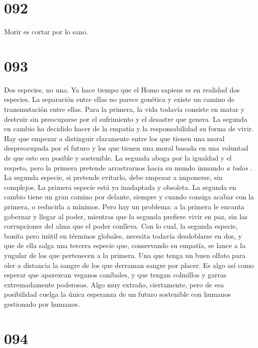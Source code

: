\documentclass[a4paper,11pt,openright,twocolumn]{book}
\begin{document}
\section*{092}

Morir es cortar por lo sano.

\section*{093}

Dos especies, no una. Ya hace tiempo que el Homo sapiens es en realidad dos especies. La separación
entre ellas no parece genética y existe un camino de transmutación entre ellas. Para la primera,
la vida todavía consiste en matar y destruir sin preocuparse
por el sufrimiento y el desastre que genera. La segunda en cambio ha decidido hacer de la empatía y la 
responsabilidad su forma de vivir. Hay que empezar a distinguir claramente entre los que tienen una moral
despreocupada por el futuro y los que tienen una moral basada en una voluntad de que este sea posible
y sostenible. La segunda aboga por la igualdad y el respeto, pero la primera pretende arrastrarnos hacia
su mundo inmundo {\it  a todos}  . La segunda especie, si pretende evitarlo, debe empezar a imponerse, 
sin complejos. La primera especie está
ya inadaptada y obsoleta. La segunda en cambio tiene un gran camino por delante, siempre y cuando consiga
acabar con la primera, o reducirla a mínimos. Pero hay un problema: a la primera le encanta gobernar y
llegar al poder, mientras que la segunda prefiere vivir en paz, sin las corrupciones del alma que el poder
conlleva. Con lo cual, la segunda especie, bonita pero inútil en términos globales, necesita todavía desdoblarse
en dos, y que de ella salga una
tercera especie que, conservando su empatía, se lance a la yugular de los que pertenecen a la primera. Una que
tenga un buen olfato para oler a distancia la sangre de los que derraman sangre por placer. Es
algo así como esperar que aparezcan veganos caníbales, y que tengan colmillos y garras extremadamente poderosas. 
Algo muy extraño, ciertamente, pero de esa posibilidad cuelga
la única esperanza de un futuro sostenible con humanos gestionado por humanos. 

\section*{094}
\end{document}
